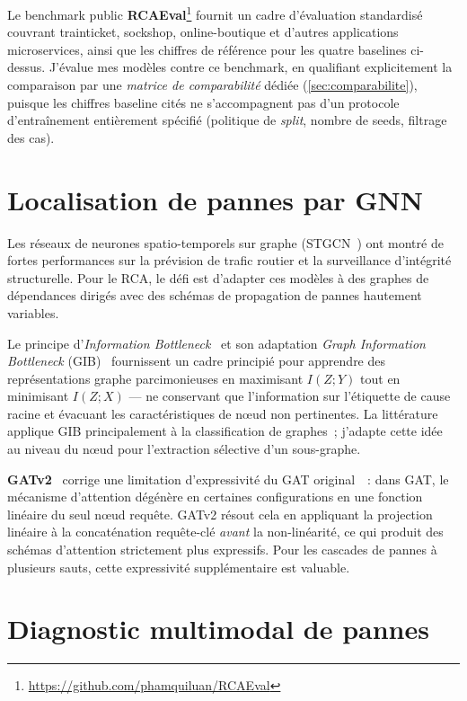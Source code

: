 \documentclass[a4paper,11pt,oneside]{report}
\begin{document}
Le benchmark public \textbf{RCAEval}\footnote{\url{https://github.com/phamquiluan/RCAEval}} fournit un cadre d'\'evaluation standardis\'e couvrant trainticket, sockshop, online-boutique et d'autres applications microservices, ainsi que les chiffres de r\'ef\'erence pour les quatre baselines ci-dessus. J'\'evalue mes mod\`eles contre ce benchmark, en qualifiant explicitement la comparaison par une \emph{matrice de comparabilit\'e} d\'edi\'ee (\cref{sec:comparabilite}), puisque les chiffres baseline cit\'es ne s'accompagnent pas d'un protocole d'entra\^inement enti\`erement sp\'ecifi\'e (politique de \emph{split}, nombre de seeds, filtrage des cas).

\section{Localisation de pannes par GNN}
\label{sec:eda-gnn}

Les r\'eseaux de neurones spatio-temporels sur graphe (STGCN~\cite{yu2018stgcn}) ont montr\'e de fortes performances sur la pr\'evision de trafic routier et la surveillance d'int\'egrit\'e structurelle. Pour le RCA, le d\'efi est d'adapter ces mod\`eles \`a des graphes de d\'ependances dirig\'es avec des sch\'emas de propagation de pannes hautement variables.

Le principe d'\emph{Information Bottleneck}~\cite{tishby2015deeplearning} et son adaptation \emph{Graph Information Bottleneck} (GIB)~\cite{wu2020gib} fournissent un cadre principi\'e pour apprendre des repr\'esentations graphe parcimonieuses en maximisant $I(Z; Y)$ tout en minimisant $I(Z; X)$ --- ne conservant que l'information sur l'\'etiquette de cause racine et \'evacuant les caract\'eristiques de nœud non pertinentes. La litt\'erature applique GIB principalement \`a la classification de graphes~; j'adapte cette id\'ee au niveau du nœud pour l'extraction s\'elective d'un sous-graphe.

\textbf{GATv2}~\cite{brody2022gatv2} corrige une limitation d'expressivit\'e du GAT original~\cite{velickovic2018gat}~: dans GAT, le m\'ecanisme d'attention d\'eg\'en\`ere en certaines configurations en une fonction lin\'eaire du seul nœud requ\^ete. GATv2 r\'esout cela en appliquant la projection lin\'eaire \`a la concat\'enation requ\^ete-cl\'e \emph{avant} la non-lin\'earit\'e, ce qui produit des sch\'emas d'attention strictement plus expressifs. Pour les cascades de pannes \`a plusieurs sauts, cette expressivit\'e suppl\'ementaire est valuable.

\section{Diagnostic multimodal de pannes}
\label{sec:eda-mm}
\end{document}
